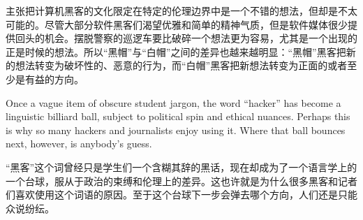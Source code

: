 \ifdefined\chs
主张把计算机黑客的文化限定在特定的伦理边界中是一个不错的想法，但却是不太可能的。尽管大部分软件黑客们渴望优雅和简单的精神气质，但是软件媒体很少提供回头的机会。摆脱警察的巡逻车要比破碎一个想法更为容易，尤其是一个出现的正是时候的想法。所以``黑帽''与``白帽''之间的差异也越来越明显：``黑帽''黑客把新的想法转变为破坏性的、恶意的行为，而``白帽''黑客把新想法转变为正面的或者至少是有益的方向。
\fi

\ifdefined\eng
Once a vague item of obscure student jargon, the word ``hacker'' has become a linguistic billiard ball, subject to political spin and ethical nuances. Perhaps this is why so many hackers and journalists enjoy using it. Where that ball bounces next, however, is anybody's guess. %
\fi

\ifdefined\chs
``黑客''这个词曾经只是学生们一个含糊其辞的黑话，现在却成为了一个语言学上的一个台球，服从于政治的束缚和伦理上的差异。这也许就是为什么很多黑客和记者们喜欢使用这个词语的原因。至于这个台球下一步会弹去哪个方向，人们还是只能众说纷纭。%
\fi
